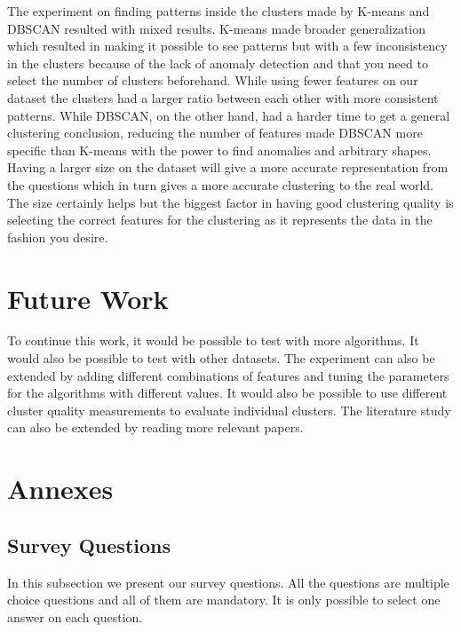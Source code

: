 \documentclass[a4paper]{article}
\begin{document}
The experiment on finding patterns inside the clusters made by K-means and DBSCAN resulted with mixed results. K-means made broader generalization which resulted in making it possible to see patterns but with a few inconsistency in the clusters because of the lack of anomaly detection and that you need to select the number of clusters beforehand. While using fewer features on our dataset the clusters had a larger ratio between each other with more consistent patterns. While DBSCAN, on the other hand, had a harder time to get a general clustering conclusion, reducing the number of features made DBSCAN more specific than K-means with the power to find anomalies and arbitrary shapes. 
Having a larger size on the dataset will give a more accurate representation from the questions which in turn gives a more accurate clustering to the real world. The size certainly helps but the biggest factor in having good clustering quality is selecting the correct features for the clustering as it represents the data in the fashion you desire.
\newpage
\section{Future Work}
To continue this work, it would be possible to test with more algorithms. It would also be possible to test with other datasets. The experiment can also be extended by adding different combinations of features and tuning the parameters for the algorithms with different values. It would also be possible to use different cluster quality measurements to evaluate individual clusters. The literature study can also be extended by reading more relevant papers. 
\newpage
\section{Annexes}
\subsection{Survey Questions}

In this subsection we present our survey questions. All the questions are multiple choice questions and all of them are mandatory. It is only possible to select one answer on each question.
\end{document}
